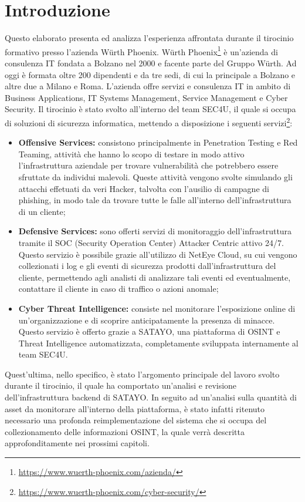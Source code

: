 \chapter{Introduzione}
\label{cha:introduction}

Questo elaborato presenta ed analizza l'esperienza affrontata durante il
tirocinio formativo presso l'azienda Würth Phoenix. Würth Phoenix\footnote{\url{https://www.wuerth-phoenix.com/azienda/}}
è un'azienda di consulenza IT fondata a Bolzano nel 2000 e facente parte del
Gruppo Würth. Ad oggi è formata oltre 200 dipendenti e da tre sedi, di cui la
principale a Bolzano e altre due a Milano e Roma. L'azienda offre servizi e consulenza
IT in ambito di Business Applications, IT Systems Management, Service Management
e Cyber Security. Il tirocinio è stato svolto all'interno del team SEC4U, il quale
si occupa di soluzioni di sicurezza informatica, mettendo a disposizione i
seguenti servizi\footnote{\url{https://www.wuerth-phoenix.com/cyber-security/}}:

\begin{itemize}
  \item \textbf{Offensive Services:} consistono principalmente in Penetration
    Testing e Red Teaming, attività che hanno lo scopo di testare in modo attivo
    l'infrastruttura aziendale per trovare vulnerabilità che potrebbero essere sfruttate
    da individui malevoli. Queste attività vengono svolte simulando gli attacchi
    effetuati da veri Hacker, talvolta con l'ausilio di campagne di phishing, in
    modo tale da trovare tutte le falle all'interno dell'infrastruttura di un
    cliente;

  \item \textbf{Defensive Services:} sono offerti servizi di monitoraggio dell'infrastruttura
    tramite il SOC (Security Operation Center) Attacker Centric attivo 24/7.
    Questo servizio è possibile grazie all'utilizzo di NetEye Cloud, su cui vengono
    collezionati i log e gli eventi di sicurezza prodotti dall'infrastruttura del
    cliente, permettendo agli analisti di analizzare tali eventi ed
    eventualmente, contattare il cliente in caso di traffico o azioni anomale;

  \item \textbf{Cyber Threat Intelligence:} consiste nel monitorare l'esposizione
    online di un'organizzazione e di scoprire anticipatamente la presenza di
    minacce. Questo servizio è offerto grazie a SATAYO, una piattaforma di OSINT
    e Threat Intelligence automatizzata, completamente sviluppata internamente al
    team SEC4U.
\end{itemize}

Quest'ultima, nello specifico, è stato l'argomento principale del lavoro svolto
durante il tirocinio, il quale ha comportato un'analisi e revisione dell'infrastruttura
backend di SATAYO. In seguito ad un'analisi sulla quantità di asset da
monitorare all'interno della piattaforma, è stato infatti ritenuto necessario una
profonda reimplementazione del sistema che si occupa del collezionamento delle informazioni
OSINT, la quale verrà descritta approfonditamente nei prossimi capitoli.